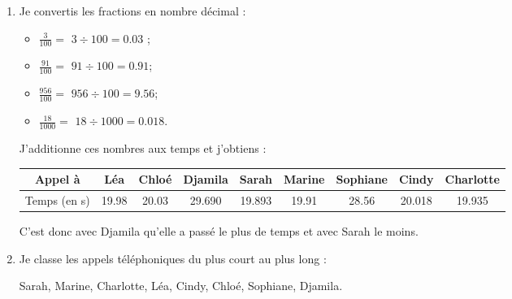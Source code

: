 \documentclass[xcolor={dvipsnames}]{beamer}
\begin{document}
\begin{frame}
	\begin{enumerate}
		\item Je convertis les fractions en nombre décimal :
		
		\begin{itemize}
			\item $ \frac{3}{100} =$ \pause $ 3 \div 100 = \num{0.03}$ ;\pause
			\item  $\frac{91}{100} = $ \pause $91 \div 100 = \num{0.91}$;\pause
			\item $\frac{956}{100} = $ \pause $956 \div 100 = \num{9.56}$;\pause
			\item $\frac{18}{1000} = $ \pause $18 \div 1000 = \num{0.018}$.
		\end{itemize}
		  
		
		J'additionne ces nombres aux temps et j'obtiens :
		
		{\footnotesize \begin{tabular}{|@{\ }c@{\ }|@{\ }c@{\ }|@{\ }c@{\ }|@{\ }c@{\ }|@{\ }c@{\ }|@{\ }c@{\ }|@{\ }c@{\ }|@{\ }c@{\ }|@{\ }c@{\ }|}
			\hline
			Appel à      & Léa         & Chloé       & Djamila      & Sarah        & Marine      & Sophiane    & Cindy        & Charlotte    \\ \hline
			Temps (en s) & \num{19.98} & \num{20.03} & \num{29.690} & \num{19.893} & \num{19.91} & \num{28.56} & \num{20.018} & \num{19.935} \\ \hline
		\end{tabular}}
	
	\vspace*{0.2cm}
		
		C'est donc avec Djamila qu'elle a passé le plus de temps et avec Sarah le moins.
		
		\item Je classe les appels téléphoniques du plus court au plus long :
		
		Sarah, Marine, Charlotte, Léa, Cindy, Chloé, Sophiane, Djamila.
	\end{enumerate}
\end{frame}
\end{document}

